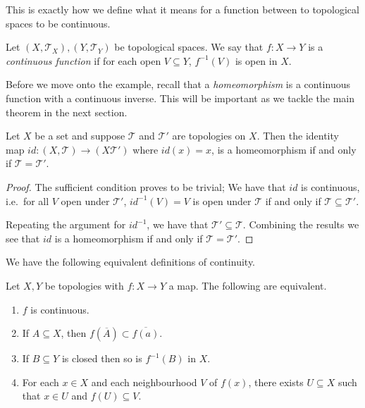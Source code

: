 This is exactly how we define what it means for a function between to
topological spaces to be continuous.

\begin{defn}
  Let $(X,\mathscr{T}_X),(Y,\mathscr{T}_Y)$ be topological spaces. We
  say that $f: X \rightarrow Y$ is a \emph{continuous function} if for
  each open $V \subseteq Y$, $f^{-1}(V)$ is open in $X$.
\end{defn}

Before we move onto the example, recall that a \emph{homeomorphism} is
a continuous function with a continuous inverse. This will be
important as we tackle the main theorem in the next section.

\begin{exmp}
  Let $X$ be a set and suppose $\mathscr{T}$ and $\mathscr{T}'$ are
  topologies on $X$. Then the identity map $id : (X,\mathscr{T})
  \rightarrow (X \mathscr{T}')$ where $id(x) = x$, is a homeomorphism
  if and only if $\mathscr{T} = \mathscr{T}'$. 
\end{exmp}

\begin{proof}
  The sufficient condition proves to be trivial;
  We have that $id$ is continuous, i.e.\ for all $V$ open under
  $\mathscr{T}'$, $id^{-1}(V) = V$ is open under $\mathscr{T}$ if and
  only if $\mathscr{T} \subseteq \mathscr{T}'$.

  Repeating the argument for $id^{-1}$, we have that $\mathscr{T}'
  \subseteq \mathscr{T}$. Combining the results we see that $id$ is a
  homeomorphism if and only if $\mathscr{T} = \mathscr{T}'$.
\end{proof}

We have the following equivalent definitions of continuity.

\begin{thm}
  Let $X,Y$ be topologies with $f : X \rightarrow Y$ a map. The
  following are equivalent.
  \begin{enumerate}
  \item $f$ is continuous.
  \item If $A \subseteq X$, then $f(\overline{A}) \subset 
    \overline{f(a)}$.
  \item If $B \subseteq Y$ is closed then so is $f^{-1}(B)$ in $X$.
  \item For each $x \in X$ and each neighbourhood $V$ of $f(x)$,
    there exists $U \subseteq X$ such that $x \in U$ and $f(U)
    \subseteq V$.
  \end{enumerate}
\end{thm}

